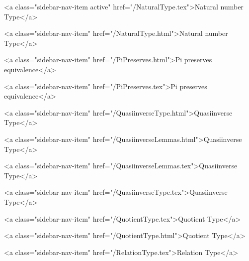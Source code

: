       
        
          <a class="sidebar-nav-item active" href="/NaturalType.tex">Natural number Type</a>
        
      
    
      
        
          <a class="sidebar-nav-item" href="/NaturalType.html">Natural number Type</a>
        
      
    
      
        
          <a class="sidebar-nav-item" href="/PiPreserves.html">Pi preserves equivalence</a>
        
      
    
      
        
          <a class="sidebar-nav-item" href="/PiPreserves.tex">Pi preserves equivalence</a>
        
      
    
      
        
          <a class="sidebar-nav-item" href="/QuasiinverseType.html">Quasiinverse Type</a>
        
      
    
      
        
          <a class="sidebar-nav-item" href="/QuasiinverseLemmas.html">Quasiinverse Type</a>
        
      
    
      
        
          <a class="sidebar-nav-item" href="/QuasiinverseLemmas.tex">Quasiinverse Type</a>
        
      
    
      
        
          <a class="sidebar-nav-item" href="/QuasiinverseType.tex">Quasiinverse Type</a>
        
      
    
      
        
          <a class="sidebar-nav-item" href="/QuotientType.tex">Quotient Type</a>
        
      
    
      
        
          <a class="sidebar-nav-item" href="/QuotientType.html">Quotient Type</a>
        
      
    
      
        
          <a class="sidebar-nav-item" href="/RelationType.tex">Relation Type</a>
        
